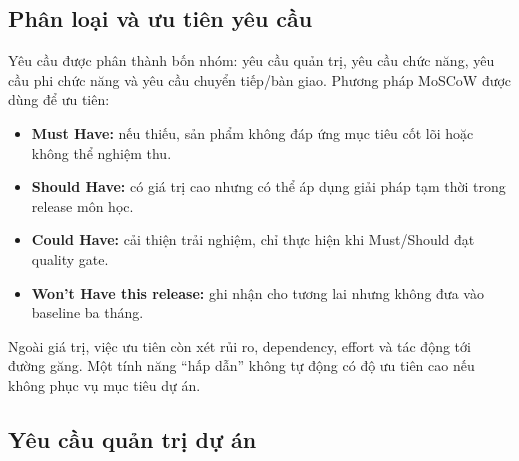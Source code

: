 \subsection{Phân loại và ưu tiên yêu cầu}

Yêu cầu được phân thành bốn nhóm: yêu cầu quản trị, yêu cầu chức năng, yêu cầu phi chức năng và yêu cầu chuyển tiếp/bàn giao. Phương pháp MoSCoW được dùng để ưu tiên:

\begin{itemize}
  \item \textbf{Must Have:} nếu thiếu, sản phẩm không đáp ứng mục tiêu cốt lõi hoặc không thể nghiệm thu.
  \item \textbf{Should Have:} có giá trị cao nhưng có thể áp dụng giải pháp tạm thời trong release môn học.
  \item \textbf{Could Have:} cải thiện trải nghiệm, chỉ thực hiện khi Must/Should đạt quality gate.
  \item \textbf{Won't Have this release:} ghi nhận cho tương lai nhưng không đưa vào baseline ba tháng.
\end{itemize}

Ngoài giá trị, việc ưu tiên còn xét rủi ro, dependency, effort và tác động tới đường găng. Một tính năng ``hấp dẫn'' không tự động có độ ưu tiên cao nếu không phục vụ mục tiêu dự án.

\fi
\subsection{Yêu cầu quản trị dự án}

